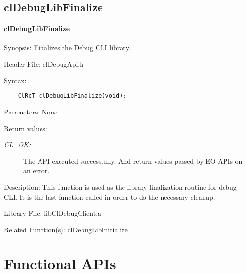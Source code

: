 \subsection{clDebugLibFinalize}
\hypertarget{pagedbg103}{}\paragraph{cl\-Debug\-Lib\-Finalize}\label{pagedbg103}
\begin{Desc}
\item[Synopsis:]Finalizes the Debug CLI library.\end{Desc}
\begin{Desc}
\item[Header File:]clDebugApi.h\end{Desc}
\begin{Desc}
\item[Syntax:]

\footnotesize\begin{verbatim}    ClRcT clDebugLibFinalize(void);
\end{verbatim}
\normalsize
\end{Desc}
\begin{Desc}
\item[Parameters:]None.\end{Desc}
\begin{Desc}
\item[Return values:]
\begin{description}
\item[{\em CL\_\-OK:}]The API executed successfully. And return values passed by EO APIs on an error.\end{description}
\end{Desc}
\begin{Desc}
\item[Description:]This function is used as the library finalization routine for debug CLI. It is the last function called in order to do the necessary cleanup.\end{Desc}
\begin{Desc}
\item[Library File:]lib\-Cl\-Debug\-Client.a\end{Desc}
\begin{Desc}
\item[Related Function(s):]\hyperlink{pagedbg102}{cl\-Debug\-Lib\-Initialize} \end{Desc}
\newpage


\section{Functional APIs}
